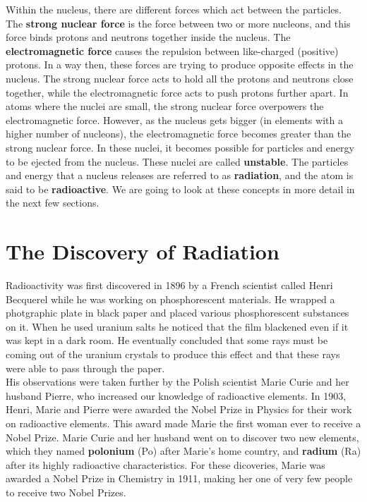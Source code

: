 Within the nucleus, there are different forces which act between the particles. The \textbf{strong nuclear force} is the force between two or more nucleons, and this force binds protons and neutrons together inside the nucleus. The \textbf{electromagnetic force} causes the repulsion between like-charged (positive) protons. In a way then, these forces are trying to produce opposite effects in the nucleus. The strong nuclear force acts to hold all the protons and neutrons close together, while the electromagnetic force acts to push protons further apart. In atoms where the nuclei are small, the strong nuclear force overpowers the electromagnetic force. However, as the nucleus gets bigger (in elements with a higher number of nucleons), the electromagnetic force becomes greater than the strong nuclear force. In these nuclei, it becomes possible for particles and energy to be ejected from the nucleus. These nuclei are called \textbf{unstable}. The particles and energy that a nucleus releases are referred to as \textbf{radiation}, and the atom is said to be \textbf{radioactive}. We are going to look at these concepts in more detail in the next few sections.







\section{The Discovery of Radiation}
\label{sec:an:td}

Radioactivity was first discovered in 1896 by a French scientist called Henri Becquerel while he was working on phosphorescent materials. He wrapped a photgraphic plate in black paper and placed various phosphorescent substances on it. When he used uranium salts he noticed that the film blackened even if it was kept in a dark room. He eventually concluded that some rays must be coming out of the uranium crystals to produce this effect and that these rays were able to pass through the paper. \\

His observations were taken further by the Polish scientist Marie Curie and her husband Pierre, who increased our knowledge of radioactive elements. In 1903, Henri, Marie and Pierre were awarded the Nobel Prize in Physics for their work on radioactive elements. This award made Marie the first woman ever to receive a Nobel Prize. Marie Curie and her husband went on to discover two new elements, which they named \textbf{polonium} (Po) after Marie's home country, and \textbf{radium} (Ra) after its highly radioactive characteristics. For these dicoveries, Marie was awarded a Nobel Prize in Chemistry in 1911, making her one of very few people to receive two Nobel Prizes. \\

